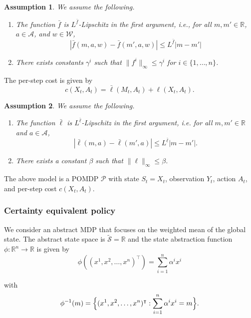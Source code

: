 \documentclass[letterpaper, 10pt]{IEEEtran}
\theoremstyle{plain}
\theoremstyle{nonumberplain}
\theoremstyle{plain}
\newtheorem{assumption}{Assumption}
\newcommand*\ALPHABET{\mathcal}
\newcommand*\reals{\mathds{R}}
\newcommand{\TRANS}{\intercal}
\begin{document}
\begin{assumption}\label{assm:mean-field-dynamics}
We assume the following.
\begin{enumerate}
\item The function $\bar f$ is $L^{\bar f}$-Lipschitz in the first argument, i.e., for all $m,m' \in \reals$, $a \in \ALPHABET A$, and $w \in \ALPHABET W$,
\begin{equation}
    |\bar f(m,a,w) - \bar f(m',a,w)| \leq L^{\bar f}|m - m'|
\end{equation}
\item  There exists constants $\gamma^i$ such that 
$\| f^i \|_{\infty} \leq \gamma^i$ for $i \in \{1, \dots, n\}$.
\end{enumerate}
\end{assumption}
The per-step cost is given by
\begin{equation}\label{eq:mean-field-cost}
    c(X_t,A_t) = \bar \ell(M_t, A_t) + \ell(X_t, A_t).
\end{equation}
\begin{assumption}\label{assm:mean-field-cost}
We assume the following. 
\begin{enumerate}
   \item The function $\bar \ell$ is $L^{\bar \ell}$-Lipschitz in the first argument, i.e. for all $m, m'\in \reals$ and $a \in \ALPHABET A$, 
   \begin{equation}
       |\bar \ell(m,a) - \bar \ell(m', a)| \leq L^{\bar \ell} |m - m'|.
   \end{equation}
   \item There exists a constant $\beta$ such that 
   $\|\ell\|_{\infty} \leq \beta$.
\end{enumerate}
\end{assumption}
The above model is a POMDP $\ALPHABET P$ with state $S_t = X_t$, observation $Y_t$, action $A_t$, and per-step cost $c(X_t,A_t)$.

\subsubsection{Certainty equivalent policy}
We consider an abstract MDP that focuses on the weighted mean of the global state. The abstract state space is $\tilde{\ALPHABET S} = \reals$ and the state abstraction function $\phi: \reals^n \to \reals$ is given by
\[
    \phi((x^1,x^2,\ldots,x^n)^\TRANS) = \sum_{i=1}^n \alpha^ix^i
\]

with
\[
    \phi^{-1}(m) = \Bigl\{(x^1,x^2,\ldots,x^n)^\TRANS: \sum_{i=1}^n \alpha^ix^i = m \Bigr\}.
\]
\end{document}
